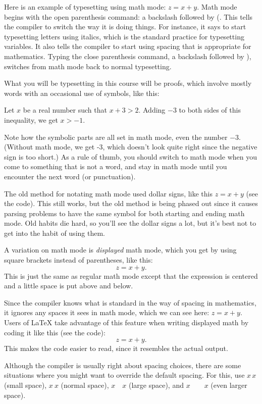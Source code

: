 \documentclass{article}
\begin{document}
Here is an example of typesetting using math mode:  \(z=x+y\).  Math mode begins with the open parenthesis command:  a
backslash followed by (.  This tells the compiler to switch the way it is doing things.  For instance, it says to start typesetting
letters using italics, which is the standard practice for typesetting variables.  It also tells the compiler to start using spacing
that is appropriate for mathematics.  Typing the close parenthesis command, a backslash followed by ), switches from math
mode back to normal typesetting.

What you will be typesetting in this course will be proofs, which involve mostly words with an occasional use of symbols, like
this:

Let \(x\) be a real number such that \(x+3>2\).  Adding \(-3\) to both sides of this inequality, we get \(x>-1\).

Note how the symbolic parts are all set in math mode, even the number \(-3\).  (Without math mode, we get -3, which doesn't look
quite right since the negative sign is too short.) As a rule of thumb, you should switch to math mode when you come to
 something that is not a word, and stay in math mode until you encounter the next word (or punctuation).

The old method for notating math mode used dollar signs, like this $z=x+y$ (see the code). This still works, but the old method is
being phased out since it causes parsing problems to have the same symbol for both starting and ending math mode.  Old habits die
hard, so you'll see the dollar signs a lot, but it's best not to get into the habit of using them.

A variation on math mode is \emph{displayed} math mode, which you get by using square brackets instead of parentheses, like this:
\[z=x+y.\] This is just the same as regular math mode except that the expression is centered and a little space is put above and
below.

Since the compiler knows what is standard in the way of spacing in mathematics, it ignores any spaces it sees in math mode, which
we can see here:  \(z   =x  +     y\).  Users of {\LaTeX} take advantage of this feature when writing displayed math by coding it
like this (see the code):
\[
z=x+y.
\]
This makes the code easier to read, since it resembles the actual output.

Although the compiler is usually right about spacing choices, there are some situations where you might want to override the
default spacing.  For this, use \(x\,x\) (small space), \(x\ x\) (normal space), \(x\quad x\) (large space), and \(x\qquad x\)
(even larger space).
\end{document}
